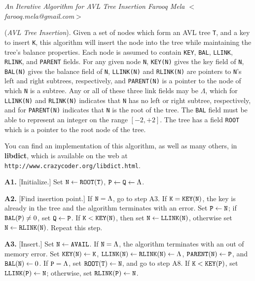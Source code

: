 \nopagenumbers
\parskip=2pt
\parindent=0pt

{\sl An Iterative Algorithm for AVL Tree Insertion
	\hfill \rm Farooq Mela $<$farooq.mela@gmail.com$>$}

\medskip

 ({\it AVL Tree Insertion}).
Given a set of nodes which form an AVL tree {\tt T}, and a key to insert
{\tt K}, this algorithm will insert the node into the tree while maintaining
the tree's balance properties. Each node is assumed to contain {\tt KEY},
{\tt BAL}, {\tt LLINK}, {\tt RLINK}, and {\tt PARENT} fields. For any given
node {\tt N}, {\tt KEY(N)} gives the key field of {\tt N}, {\tt BAL(N)} gives
the balance field of {\tt N}, {\tt LLINK(N)} and {\tt RLINK(N)} are pointers to
{\tt N}'s left and right subtrees, respectively, and {\tt PARENT(N)} is a
pointer to the node of which {\tt N} is a subtree. Any or all of these three
link fields may be $\Lambda$, which for {\tt LLINK(N)} and {\tt RLINK(N)}
indicates that {\tt N} has no left or right subtree, respectively, and for
{\tt PARENT(N)} indicates that {\tt N} is the root of the tree. The {\tt BAL}
field must be able to represent an integer on the range $[-2, +2]$. The tree
has a field {\tt ROOT} which is a pointer to the root node of the tree.

\medskip
You can find an implementation of this algorithm, as well as many others, in
{\bf libdict}, which is available on the web at
{\tt http://www.crazycoder.org/libdict.html}.
\medskip

\parindent=36pt

\item{\bf A1.} [Initialize.]
Set ${\tt N} \gets {\tt ROOT(T)}$, ${\tt P} \gets {\tt Q}\gets \Lambda$.

\item{\bf A2.} [Find insertion point.]
If ${\tt N} = \Lambda$, go to step A3.
If ${\tt K} = {\tt KEY(N)}$,
the key is already in the tree and the algorithm terminates with an error.
Set ${\tt P} \gets {\tt N}$;
if ${\tt BAL(P)} \neq 0$, set ${\tt Q} \gets {\tt P}$.
If ${\tt K} < {\tt KEY(N)}$,
then set ${\tt N} \gets {\tt LLINK(N)}$,
otherwise set ${\tt N} \gets {\tt RLINK(N)}$. Repeat this step.

\item{\bf A3.} [Insert.]
Set ${\tt N} \gets {\tt AVAIL}$.
If ${\tt N} = \Lambda$, the algorithm terminates with an out of memory error.
Set ${\tt KEY(N)} \gets {\tt K}$,
${\tt LLINK(N)} \gets {\tt RLINK(N)} \gets \Lambda$,
${\tt PARENT(N)} \gets {\tt P}$, and
${\tt BAL(N)} \gets 0$.
If ${\tt P} = \Lambda$, set ${\tt ROOT(T)} \gets {\tt N}$, and go to step A8.
If ${\tt K} < {\tt KEY(P)}$,
set ${\tt LLINK(P)} \gets {\tt N}$; otherwise,
set ${\tt RLINK(P)} \gets {\tt N}$.

